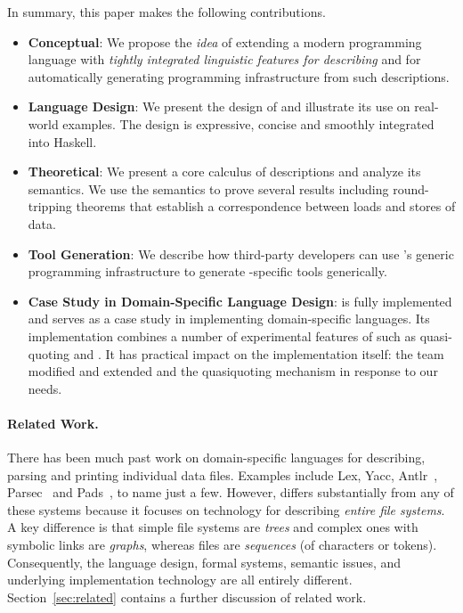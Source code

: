 In summary, this paper makes the following contributions.
%
%
\begin{itemize}
\item {\bf Conceptual}:  We propose the {\em idea} 
of extending a modern programming language with
{\em tightly integrated linguistic features for describing \filestores{}}
and for automatically generating programming infrastructure from such 
descriptions.

\item {\bf Language Design}: We present the design of \forest{}
  and illustrate its use on real-world examples.
  The design is expressive, concise and smoothly integrated into
  Haskell.  

\item {\bf Theoretical}: We present a core calculus of \forest{}
descriptions and analyze its semantics.  We use the semantics
to prove several results including round-tripping theorems that
establish a correspondence between loads and stores of \filestore{} data.

\item {\bf Tool Generation}: We describe how third-party developers
  can use \haskell{}'s generic programming infrastructure to generate
  \filestore{}-specific tools generically.

\item {\bf Case Study in Domain-Specific Language Design}: \forest{}
  is fully implemented and serves
  as a case study in implementing domain-specific
  languages. Its implementation combines a number of
  experimental features of \haskell{} such as quasi-quoting and \template{}.
  It has practical impact on the \haskell{} implementation itself:  
  the \haskell{} team modified and extended \template{} and the
  quasiquoting mechanism in response to our needs. 
\end{itemize}

\paragraph*{Related Work.}
There has been much past work on domain-specific languages for
describing, parsing and printing individual data files. 
Examples include 
Lex, Yacc,
Antlr~\cite{antlr}, Parsec~\cite{LeijenMeijer:parsec} and 
Pads~\cite{fisher+:toplas}, to name just a few.  
However, \forest{} differs
substantially from any of these systems because it focuses on technology
for describing {\em entire file systems}.  
A key difference is that
simple file systems are {\em trees} and complex ones with symbolic links are 
{\em graphs}, whereas files are {\em sequences} (of characters
or tokens). Consequently,
the language design, formal systems,
semantic issues, and underlying implementation 
technology are all entirely different.  Section~\ref{sec:related}
contains a further discussion of related work.


